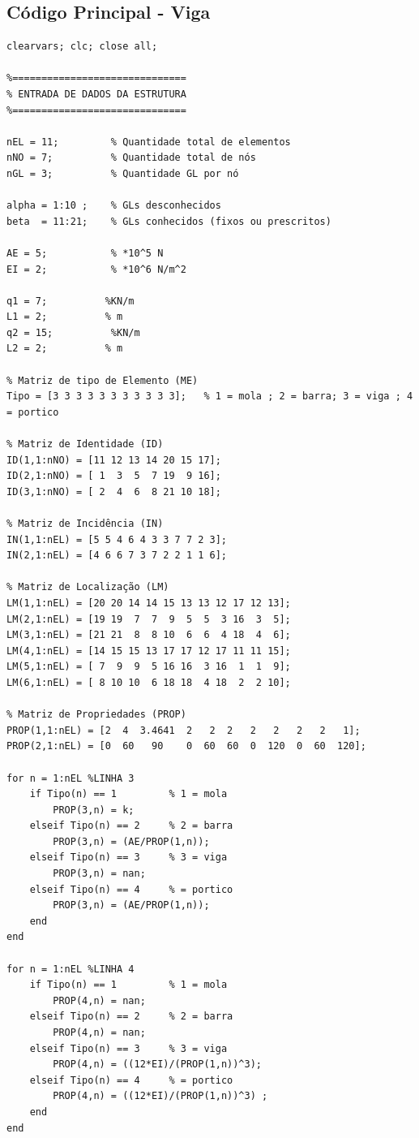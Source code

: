 \documentclass[deposito, acronym, symbols]{fei}
\begin{document}
\subsection{Código Principal - Viga}

\begin{lstlisting}
clearvars; clc; close all;

%==============================
% ENTRADA DE DADOS DA ESTRUTURA
%==============================

nEL = 11;         % Quantidade total de elementos
nNO = 7;          % Quantidade total de nós
nGL = 3;          % Quantidade GL por nó

alpha = 1:10 ;    % GLs desconhecidos
beta  = 11:21;    % GLs conhecidos (fixos ou prescritos)

AE = 5;           % *10^5 N
EI = 2;           % *10^6 N/m^2

q1 = 7;          %KN/m
L1 = 2;          % m
q2 = 15;          %KN/m
L2 = 2;          % m
 
% Matriz de tipo de Elemento (ME)
Tipo = [3 3 3 3 3 3 3 3 3 3 3];   % 1 = mola ; 2 = barra; 3 = viga ; 4 = portico
 
% Matriz de Identidade (ID)
ID(1,1:nNO) = [11 12 13 14 20 15 17];
ID(2,1:nNO) = [ 1  3  5  7 19  9 16];
ID(3,1:nNO) = [ 2  4  6  8 21 10 18];

% Matriz de Incidência (IN)
IN(1,1:nEL) = [5 5 4 6 4 3 3 7 7 2 3];
IN(2,1:nEL) = [4 6 6 7 3 7 2 2 1 1 6];

% Matriz de Localização (LM)
LM(1,1:nEL) = [20 20 14 14 15 13 13 12 17 12 13];
LM(2,1:nEL) = [19 19  7  7  9  5  5  3 16  3  5];
LM(3,1:nEL) = [21 21  8  8 10  6  6  4 18  4  6];
LM(4,1:nEL) = [14 15 15 13 17 17 12 17 11 11 15];
LM(5,1:nEL) = [ 7  9  9  5 16 16  3 16  1  1  9];
LM(6,1:nEL) = [ 8 10 10  6 18 18  4 18  2  2 10];

% Matriz de Propriedades (PROP)
PROP(1,1:nEL) = [2  4  3.4641  2   2  2   2   2   2   2   1];
PROP(2,1:nEL) = [0  60   90    0  60  60  0  120  0  60  120];

for n = 1:nEL %LINHA 3
    if Tipo(n) == 1         % 1 = mola
        PROP(3,n) = k;
    elseif Tipo(n) == 2     % 2 = barra
        PROP(3,n) = (AE/PROP(1,n));
    elseif Tipo(n) == 3     % 3 = viga
        PROP(3,n) = nan;
    elseif Tipo(n) == 4     % = portico 
        PROP(3,n) = (AE/PROP(1,n));
    end
end

for n = 1:nEL %LINHA 4
    if Tipo(n) == 1         % 1 = mola
        PROP(4,n) = nan;
    elseif Tipo(n) == 2     % 2 = barra
        PROP(4,n) = nan;
    elseif Tipo(n) == 3     % 3 = viga
        PROP(4,n) = ((12*EI)/(PROP(1,n))^3);
    elseif Tipo(n) == 4     % = portico 
        PROP(4,n) = ((12*EI)/(PROP(1,n))^3) ;
    end
end


\end{lstlisting}
\end{document}
